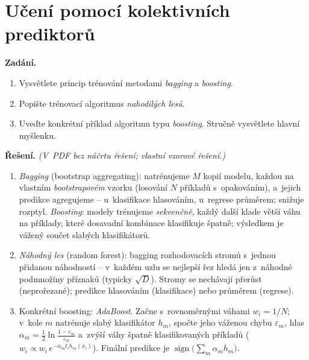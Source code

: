 \section{Učení pomocí kolektivních prediktorů}

\noindent\textbf{Zadání.}\par
\begin{enumerate}
  \item Vysvětlete princip trénování metodami \emph{bagging} a \emph{boosting}.
  \item Popište trénovací algoritmus \emph{nahodilých lesů}.
  \item Uveďte konkrétní příklad algoritmu typu \emph{boosting}. Stručně vysvětlete hlavní myšlenku.
\end{enumerate}

\medskip
\noindent\textbf{Řešení.} \textit{(V~PDF bez náčrtu řešení; vlastní vzorové řešení.)}\par
\begin{enumerate}[nosep]
  \item \emph{Bagging} (bootstrap aggregating): natrénujeme $M$ kopií modelu, každou na vlastním \emph{bootstrapovém} vzorku (losování $N$ příkladů s~opakováním), a~jejich predikce agregujeme -- u~klasifikace hlasováním, u~regrese průměrem; snižuje rozptyl. \emph{Boosting}: modely trénujeme \emph{sekvenčně}, každý další klade větší váhu na příklady, které dosavadní kombinace klasifikuje špatně; výsledkem je vážený součet slabých klasifikátorů.
  \item \emph{Náhodný les} (random forest): bagging rozhodovacích stromů s~jednou přidanou náhodností -- v~každém uzlu se nejlepší řez hledá jen z~náhodné podmnožiny příznaků (typicky $\sqrt{D}$). Stromy se nechávají přerůst (neprořezané); predikce hlasováním (klasifikace) nebo průměrem (regrese).
  \item Konkrétní boosting: \emph{AdaBoost}. Začne s~rovnoměrnými váhami $w_i=1/N$; v~kole $m$ natrénuje slabý klasifikátor $h_m$, spočte jeho váženou chybu $\varepsilon_m$, hlas $\alpha_m=\tfrac12\ln\frac{1-\varepsilon_m}{\varepsilon_m}$ a~zvýší váhy špatně klasifikovaných příkladů ($w_i\propto w_i\,e^{-\alpha_m t_i h_m(x_i)}$). Finální predikce je $\operatorname{sign}\!\big(\sum_m \alpha_m h_m\big)$.
\end{enumerate}
